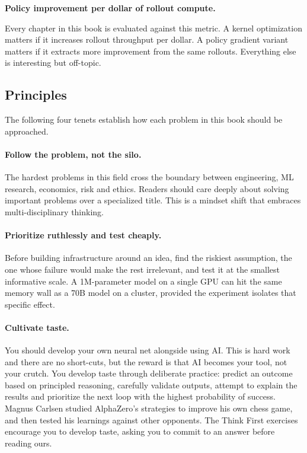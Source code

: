 \begin{tcolorbox}[colback=beni!5!white, colframe=beni!80!black, boxrule=0.6pt,
  left=5pt, right=5pt, top=6pt, bottom=6pt,
  fonttitle=\bfseries, title=North Star Metric]
\textbf{Policy improvement per dollar of rollout compute.}

\smallskip
Every chapter in this book is evaluated against this metric. A kernel optimization matters if it increases rollout throughput per dollar. A policy gradient variant matters if it extracts more improvement from the same rollouts. Everything else is interesting but off-topic.
\end{tcolorbox}

\subsection*{Principles}

The following four tenets establish how each problem in this book should be approached.

\paragraph{Follow the problem, not the silo.}
The hardest problems in this field cross the boundary between  engineering, ML research, economics, risk and ethics. Readers should care deeply about solving important problems over a specialized title. This is a mindset shift that embraces multi-disciplinary thinking.

\paragraph{Prioritize ruthlessly and test cheaply.}
Before building infrastructure around an idea, find the riskiest assumption, the one whose failure would make the rest irrelevant, and test it at the smallest informative scale. A 1M-parameter model on a single GPU can hit the same memory wall as a 70B model on a cluster, provided the experiment isolates that specific effect.

\paragraph{Cultivate taste.}
You should develop your own neural net alongside using AI. This is hard work and there are no short-cuts, but the reward is that AI becomes your tool, not your crutch. You develop taste through deliberate practice: predict an outcome based on principled reasoning, carefully validate outputs, attempt to explain the results and prioritize the next loop with the highest probability of success. Magnus Carlsen studied AlphaZero's strategies to improve his own chess game, and then tested his learnings against other opponents.  The Think First exercises encourage you to develop taste, asking you to commit to an answer before reading ours.

